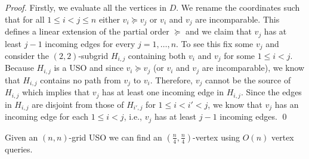 \documentclass[runningheads,a4paper]{llncs}
\newcommand{\JN}[1]{\marginpar{\parbox{3.6cm}{{\small {\bf JN:} #1}}}} %
\begin{document}
\begin{proof}
Firstly, we evaluate all the vertices in $D$.
We rename the coordinates such that for all $1 \leq i < j\leq n$ either $v_i \succeq v_j$ or $v_i$ and $v_j$ are incomparable. 
This defines a linear extension of the partial order $\succeq$ and we claim that $v_j$ has at least $j-1$ incoming edges for every $j = 1, \ldots, n$. 
To see this fix some $v_j$ and consider the $(2,2)$-subgrid $H_{i,j}$ containing both $v_i$ and $v_j$ for some $1\leq i < j$. 
Because $H_{i,j}$ is a USO and since $v_i \succeq v_j$ (or $v_i$ and $v_j$ are incomparable), we know that $H_{i,j}$ contains no path from $v_j$ to $v_i$. 
Therefore, $v_j$ cannot be the source of $H_{i,j}$  which implies that $v_j$ has at least one incoming edge in $H_{i,j}$. 
Since the edges in $H_{i,j}$ are disjoint from those of $H_{i',j}$ for $1\leq i < i' < j$, 
we know that $v_j$ has an incoming edge for each $1\leq i< j$, i.e., $v_j$ has at least $j-1$ incoming edges. 
 \qed
\end{proof}

\begin{lemma}
\label{lem:seed_lemma_for_square_matrices}
 Given an $(n, n)$-grid USO we can find an $(\frac{n}{4}, \frac{n}{4})$-vertex using $O(n)$ vertex queries.
\end{lemma}
\end{document}
